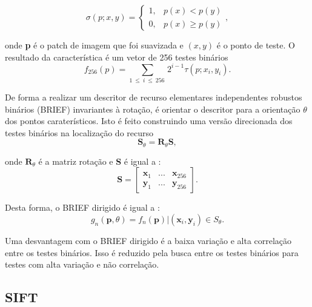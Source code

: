 \begin{equation}\label{equacao2.5.1.4}

\sigma\left(p;x,y\right) = \left\{\begin{array}{cc}
1, & p(x)<p(y) \\ 
0, & p(x) \geq  p(y)   
\end{array}\right.
,\end{equation}

onde \textbf{p} é o patch de imagem que foi suavizada e \textbf{$(x,y)$} é o ponto de teste.
O resultado da característica é um vetor de 256 testes binários 
\begin{equation}\label{equacao2.5.1.5}
f_{256} \left( p \right) = \sum_{1\ \le\ i\ \le\ 256\ } {2^{i-1}\tau\left(p;x_i,y_i\right) } .
\end{equation} 

De forma a realizar um descritor de recurso elementares independentes robustos binários (BRIEF) invariantes à rotação, é orientar o descritor para a orientação $\theta$ dos pontos caraterísticos. Isto é feito construindo uma versão direcionada dos testes binários na localização do recurso 
\begin{equation}\label{equacao2.5.1.6}
\textbf{$\textbf{S}_{\theta} = \textbf{R}_{\theta}\textbf{S}$},
\end{equation} 

 onde \textbf{$\textbf{R}_{\theta}$} é a matriz rotação e \textbf{S} é igual a : 
 \begin{equation}\label{equacao2.5.1.7}
  \textbf{S} = \left[ \begin{array}{ccc}
\textbf{x}_1 & ... & \textbf{x}_{256}\\
\textbf{y}_1 & ... & \textbf{y}_{256}
\end{array} \right] . 
\end{equation}


Desta forma, o BRIEF dirigido é igual a : 
\begin{equation}\label{equacao2.5.1.8} g_n(\textbf{p},\theta) = f_n(\textbf{p})|(\textbf{x}_i,\textbf{y}_i) \in S_{\theta} .
\end{equation}


Uma desvantagem com o BRIEF dirigido é a baixa variação e alta correlação entre os testes binários. Isso é reduzido pela busca entre os testes binários para testes com alta variação e não correlação. 	

\subsection{SIFT}

